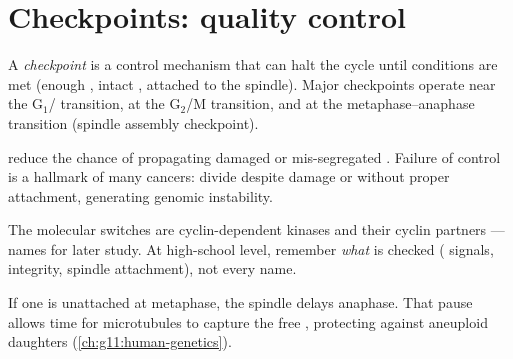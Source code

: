 \section{Checkpoints: quality control}

\begin{definition}[Checkpoint]\label{def:g11:cell-cycle-mitosis:checkpoint}
A \emph{checkpoint} is a control mechanism that can halt the
cycle until conditions are met (enough , intact ,  attached
to the spindle). Major checkpoints operate near the G$_1$/ transition, at the
G$_2$/M transition, and at the metaphase--anaphase transition (spindle assembly
checkpoint).
\end{definition}

\begin{proposition}\label{prop:g11:cell-cycle-mitosis:cp-role}
 reduce the chance of propagating damaged  or mis-segregated
. Failure of  control is a hallmark of many cancers: 
divide despite  damage or without proper attachment, generating genomic
instability.
\end{proposition}
\admitted

\begin{remark}
The molecular switches are cyclin-dependent kinases and their cyclin partners
--- names for later study. At high-school level, remember \emph{what} is checked
( signals,  integrity, spindle attachment), not every  name.
\end{remark}

\begin{example}\label{ex:g11:cell-cycle-mitosis:spindle}
If one  is unattached at metaphase, the spindle  delays
anaphase. That pause allows time for microtubules to capture the free
, protecting against aneuploid daughters
(\cref{ch:g11:human-genetics}).
\end{example}

